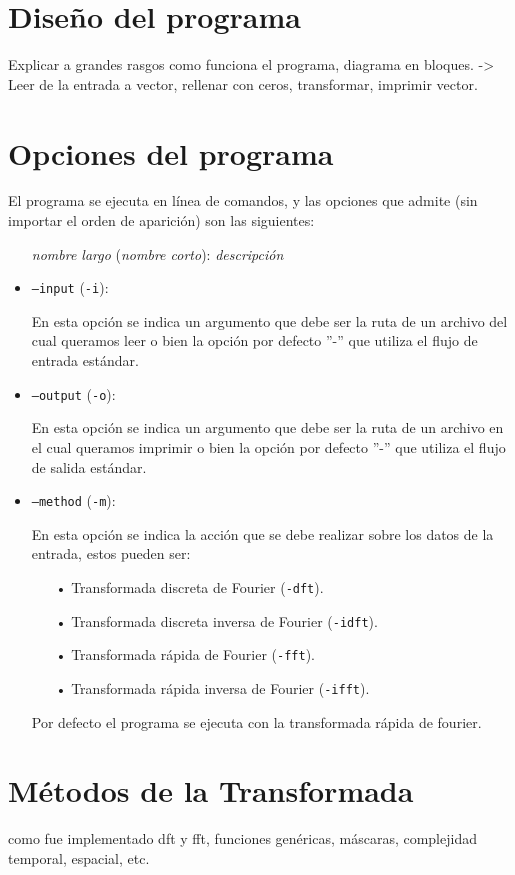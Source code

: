 \documentclass{article}
\begin{document}
\section{Diseño del programa}
  Explicar a grandes rasgos como funciona el programa, diagrama en bloques.
  -> Leer de la entrada a vector, rellenar con ceros, transformar, imprimir vector.

\section{Opciones del programa}
  El programa se ejecuta en línea de comandos, y las opciones que admite (sin importar el orden de aparición) son las siguientes:
  \begin{itemize}
    \item[] \textit{nombre largo} (\textit{nombre corto}): \textit{descripción}
    \item \texttt{--input} (\texttt{-i}): 
    
    En esta opción se indica un argumento que debe ser la ruta de un archivo del cual queramos leer o bien la opción por defecto ”-” que utiliza el flujo de entrada estándar.
    \item \texttt{--output} (\texttt{-o}): 
    
    En esta opción se indica un argumento que debe ser la ruta de un archivo en el cual queramos imprimir o bien la opción por defecto ”-” que utiliza el flujo de salida estándar.
    \item \texttt{--method} (\texttt{-m}): 
    
    En esta opción se indica la acción que se debe realizar sobre los datos de la entrada, estos pueden ser:
    \begin{itemize}
    \item[•]Transformada discreta de Fourier (\texttt{-dft}).
    \item[•]Transformada discreta inversa de Fourier (\texttt{-idft}).
    \item[•]Transformada rápida de Fourier (\texttt{-fft}).
    \item[•]Transformada rápida inversa de Fourier (\texttt{-ifft}).
    
    \end{itemize}
    Por defecto el programa se ejecuta con la transformada rápida de fourier.
  \end{itemize}

\section{Métodos de la Transformada}
  como fue implementado dft y fft, funciones genéricas, máscaras, complejidad temporal, espacial, etc.
\end{document}
